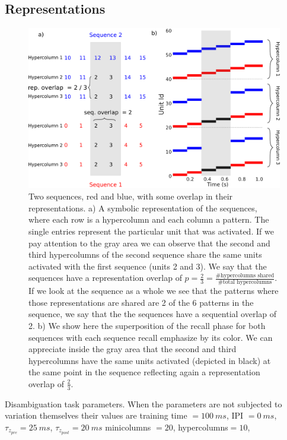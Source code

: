 \documentclass[10pt,a4paper]{article}
\begin{document}
\subsection{Representations}

\begin{figure}[H]
\centering
\includegraphics[scale=0.20]{rep_diagram.pdf}
\caption{Two sequences, red and blue, with some overlap in their representations. a) A symbolic representation of the sequences, where each row is a hypercolumn and each column a pattern. The single entries represent the particular unit that was activated. If we pay attention to the gray area we can observe that the second and third hypercolumns of the second sequence share the same units activated with the first sequence (units 2 and 3). We say that the sequences have a representation overlap of $p=\frac{2}{3} = \frac{\text{\# hypercolumns shared}}{\text{\# total hypercolumns}}$. If we look at the sequence as a whole we see that the patterns where those representations are shared are 2 of the 6 patterns in the sequence, we say that the the sequences have a sequential overlap of 2. b) We show here the superposition of the recall phase for both sequences with each sequence recall emphasize by its color. We can appreciate inside the gray area that the second and third hypercolumns have the same units activated (depicted in black) at the same point in the sequence reflecting again a representation overlap of $\frac{2}{3}$.}
\label{fig:rep_diagram}
\end{figure}

Disambiguation task parameters.
When the parameters are not subjected to variation themselves their values are training time $= 100 \: ms$, IPI $= 0 \: ms$, $\tau_{z_{pre}} = 25 \: ms$, $\tau_{z_{post}} = 20 \: ms$ minicolumns $=20$, hypercolumns$=10$,  
\end{document}
